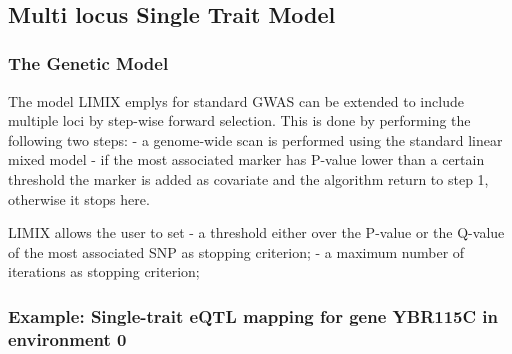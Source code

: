 \documentclass{article}
\begin{document}
    \begin{center}
    \end{center}
    { \hspace*{\fill} \\}
    

    \subsection{Multi locus Single Trait Model}



    \subsubsection{The Genetic Model}


    The model LIMIX emplys for standard GWAS can be extended to include
multiple loci by step-wise forward selection. This is done by performing
the following two steps: - a genome-wide scan is performed using the
standard linear mixed model - if the most associated marker has P-value
lower than a certain threshold the marker is added as covariate and the
algorithm return to step 1, otherwise it stops here.

LIMIX allows the user to set - a threshold either over the P-value or
the Q-value of the most associated SNP as stopping criterion; - a
maximum number of iterations as stopping criterion;


    \subsubsection{Example: Single-trait eQTL mapping for gene YBR115C in environment 0}
\end{document}
